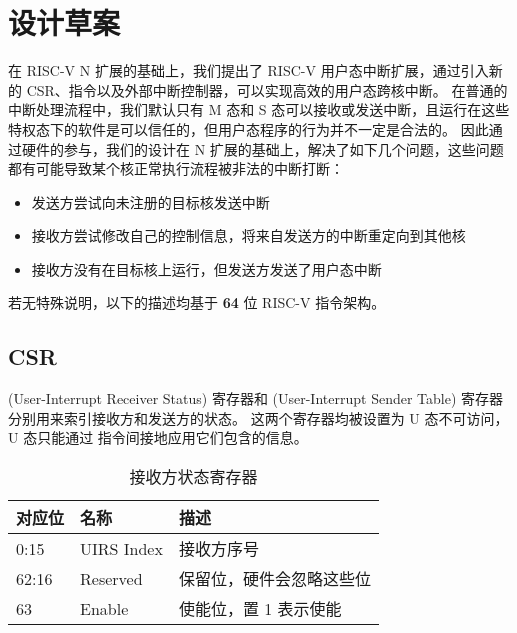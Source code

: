 
\chapter{设计草案}

在 RISC-V N 扩展的基础上，我们提出了 RISC-V 用户态中断扩展，通过引入新的 CSR、指令以及外部中断控制器，可以实现高效的用户态跨核中断。
在普通的中断处理流程中，我们默认只有 M 态和 S 态可以接收或发送中断，且运行在这些特权态下的软件是可以信任的，但用户态程序的行为并不一定是合法的。
因此通过硬件的参与，我们的设计在 N 扩展的基础上，解决了如下几个问题，这些问题都有可能导致某个核正常执行流程被非法的中断打断：

\begin{itemize}
    \item 发送方尝试向未注册的目标核发送中断
    \item 接收方尝试修改自己的控制信息，将来自发送方的中断重定向到其他核
    \item 接收方没有在目标核上运行，但发送方发送了用户态中断
\end{itemize}

若无特殊说明，以下的描述均基于 \textbf{64} 位 RISC-V 指令架构。

\section{CSR}

\textbf{\Rsuirs}(User-Interrupt Receiver Status) 寄存器和 \textbf{\Rsuist}(User-Interrupt Sender Table) 寄存器分别用来索引接收方和发送方的状态。
这两个寄存器均被设置为 U 态不可访问，U 态只能通过 \Iuipi 指令间接地应用它们包含的信息。

\begin{table}
    \centering
    \begin{threeparttable}[c]
        \label{tab:three-part-table-0}
        \begin{tabular}{|l|l|l|}
            \hline
            对应位 & 名称 & 描述 \\
            \hline
            0:15 & UIRS Index & 接收方序号 \\
            \hline
            62:16 & Reserved & 保留位，硬件会忽略这些位 \\
            \hline
            63 & Enable & 使能位，置 1 表示使能 \\
            \hline
        \end{tabular}
        \caption{接收方状态寄存器}
    \end{threeparttable}
\end{table}

